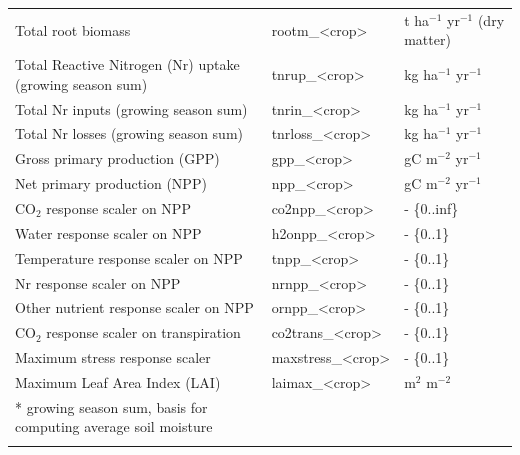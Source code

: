 \documentclass[gmd, manuscript]{copernicus} %
\providecommand{\DIFadd}[1]{{\protect\color{blue}\uwave{#1}}} %
\providecommand{\DIFaddFL}[1]{\DIFadd{#1}} %
\providecommand{\DIFaddbeginFL}{} %
\providecommand{\DIFaddendFL}{} %
\begin{document}
\begin{table}[]
\begin{tabular}{lll}
    Total root biomass                                       & rootm\_<crop>     & t ha$^{-1}$ yr$^{-1}$ (dry matter)  \\
    Total Reactive Nitrogen (Nr) uptake (growing season sum) & tnrup\_<crop>     & kg ha$^{-1}$ yr$^{-1}$              \\
    Total Nr inputs (growing season sum)                     & tnrin\_<crop>     & kg ha$^{-1}$ yr$^{-1}$              \\
    Total Nr losses (growing season sum)                     & tnrloss\_<crop>   & kg ha$^{-1}$ yr$^{-1}$              \\
    Gross primary production (GPP)                           & gpp\_<crop>       & gC m$^{-2}$ yr$^{-1}$               \\
    Net primary production (NPP)                             & npp\_<crop>       & gC m$^{-2}$ yr$^{-1}$               \\
    CO$_2$ response scaler on NPP                            & co2npp\_<crop>    & - \{0..inf\}                \\
    Water response scaler on NPP                             & h2onpp\_<crop>    & - \{0..1\}                  \\
    Temperature response scaler on NPP                       & tnpp\_<crop>      & - \{0..1\}                  \\
    Nr response scaler on NPP                                & nrnpp\_<crop>     & - \{0..1\}                  \\
    Other nutrient response scaler on NPP                    & ornpp\_<crop>     & - \{0..1\}                  \\
    CO$_2$ response scaler on transpiration                  & co2trans\_<crop>  & - \{0..1\}                  \\
    Maximum stress response scaler                           & maxstress\_<crop> & - \{0..1\}                  \\
    Maximum Leaf Area Index (LAI)                            & laimax\_<crop>    & m$^{2}$ m$^{-2}$           \\        
    \bottomhline
    * growing season sum, basis for computing average soil moisture & {} & {} \\
    \DIFaddbeginFL \DIFaddFL{$\dagger$ provided where possible }& {} & {} \\
  \DIFaddendFL \end{tabular}
\end{table}
\end{document}
